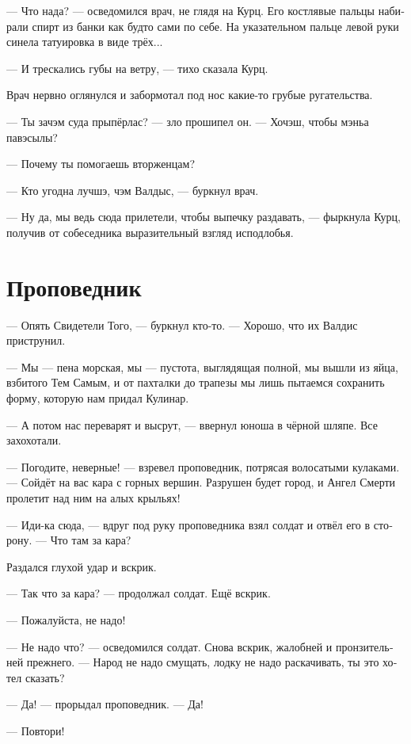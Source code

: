 \documentclass[a4paper,12pt,fleqn]{book}\usepackage{cooltooltips}\usepackage{polyglossia}\setdefaultlanguage[babelshorthands=true]{russian}\setotherlanguage{english}\defaultfontfeatures{Ligatures=TeX,Mapping=tex-text} \usepackage{xcolor}\definecolor{lightgray}{HTML}{bbbbbb}\color{lightgray}\newcommand{\ml}[3]{\textenglish{\textcolor{black}{#3}}}
\newcommand{\asterism}{\vspace{1em}{\centering\Large\bfseries$\ast~\ast~\ast$\par}\vspace{1em}}
\begin{document}
--- Что нада? --- осведомился врач, не глядя на Курц.
Его костлявые пальцы набирали спирт из банки как будто сами по себе.
На указательном пальце левой руки синела татуировка в виде трёх...

--- И трескались губы на ветру, --- тихо сказала Курц.

Врач нервно оглянулся и забормотал под нос какие-то грубые ругательства.

--- Ты зачэм суда прыпёрлас? --- зло прошипел он. --- Хочэш, чтобы мэньа павэсылы?

\asterism

--- Почему ты помогаешь вторженцам?

--- Кто угодна лучшэ, чэм Валдыс, --- буркнул врач.

--- Ну да, мы ведь сюда прилетели, чтобы выпечку раздавать, --- фыркнула Курц, получив от собеседника выразительный взгляд исподлобья.

\section{Проповедник}

--- Опять Свидетели Того, --- буркнул кто-то.
--- Хорошо, что их Валдис приструнил.

--- Мы --- пена морская, мы --- пустота, выглядящая полной, мы вышли из яйца, взбитого Тем Самым, и от пахталки до трапезы мы лишь пытаемся сохранить форму, которую нам придал Кулинар.

--- А потом нас переварят и высрут, --- ввернул юноша в чёрной шляпе.
Все захохотали.

--- Погодите, неверные! --- взревел проповедник, потрясая волосатыми кулаками.
--- Сойдёт на вас кара с горных вершин.
Разрушен будет город, и Ангел Смерти пролетит над ним на алых крыльях!

--- Иди-ка сюда, --- вдруг под руку проповедника взял солдат и отвёл его в сторону.
--- Что там за кара?

Раздался глухой удар и вскрик.

--- Так что за кара? --- продолжал солдат.
Ещё вскрик.

--- Пожалуйста, не надо!

--- Не надо что? --- осведомился солдат.
Снова вскрик, жалобней и пронзительней прежнего.
--- Народ не надо смущать, лодку не надо раскачивать, ты это хотел сказать?

--- Да! --- прорыдал проповедник.
--- Да!

--- Повтори!
\end{document}
